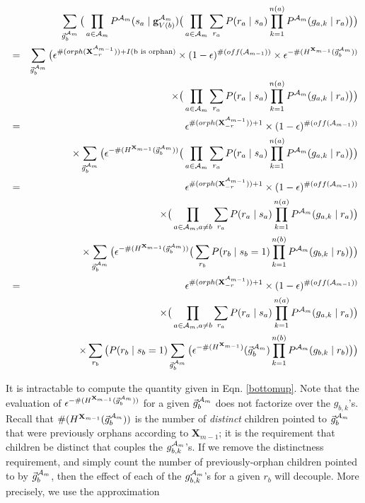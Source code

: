 \documentclass[11pt]{article}
\newcommand{\A}{{\cal A}}
\newcommand{\X}{\mathbf{X}}
\newcommand{\XrmPrev}{\X^{\A_{m-1}}_{-r}}
\newcommand{\Am}{\A_{m}}
\begin{document}
\begin{eqnarray}
& &\sum_{\vec{g}^{\Am}_{b}} \big( \prod_{a \in {\Am}} P^{\Am}(s_a \mid \mathbf{g}^{\Am}_{V({b})})  \big( \prod_{a \in {\A_{m}}} \sum_{r_a} P(r_a \mid s_a) \prod_{k=1}^{n(a)} P^{\Am}(g_{a,k} \mid r_a) \big) \big ) \\
%
&=& \sum_{\vec{g}^{\Am}_{b}} \big(\epsilon^{\#(orph(\XrmPrev)) + I(\text{b is orphan})} \times (1-\epsilon)^{\#(off(\A_{m-1}))} \times \epsilon^{- \#(H^{\X_{m-1}}(\vec{g}_b^{\Am}))}  \nonumber \\
& & \times \big( \prod_{a \in {\A_{m}}} \sum_{r_a} P(r_a \mid s_a) \prod_{k=1}^{n(a)} P^{\Am}(g_{a,k} \mid r_a) \big) \big) \\
%
&=& \epsilon^{\#(orph(\XrmPrev)) + 1} \times (1-\epsilon)^{\#(off(\A_{m-1}))} \nonumber \\
& & \times  \sum_{\vec{g}^{\Am}_{b}} \big( \epsilon^{- \#(H^{\X_{m-1}}(\vec{g}_b^{\Am}))}  \big( \prod_{a \in {\A_{m}}} \sum_{r_a} P(r_a \mid s_a) \prod_{k=1}^{n(a)} P^{\Am}(g_{a,k} \mid r_a) \big) \big) \\
%
&=& \epsilon^{\#(orph(\XrmPrev)) + 1} \times (1-\epsilon)^{\#(off(\A_{m-1}))} \nonumber \\
& &\times  \big( \prod_{a \in {\A_{m}}, a \neq b} \sum_{r_a} P(r_a \mid s_a) \prod_{k=1}^{n(a)} P^{\Am}(g_{a,k} \mid r_a) \big) \\
& & \times \sum_{\vec{g}^{\Am}_{b}} \big( \epsilon^{- \#(H^{\X_{m-1}}(\vec{g}_b^{\Am}))} \big( \sum_{r_b} P(r_b \mid s_b = 1) \prod_{k=1}^{n(b)} P^{\Am}(g_{b,k} \mid r_b) \big) \big) \nonumber \\
%
&=& \epsilon^{\#(orph(\XrmPrev)) + 1} \times (1-\epsilon)^{\#(off(\A_{m-1}))} \label{bottomup}  \\
& & \times \big( \prod_{a \in {\A_{m}}, a \neq b} \sum_{r_a} P(r_a \mid s_a) \prod_{k=1}^{n(a)} P^{\Am}(g_{a,k} \mid r_a) \big)  \\
& & \times \sum_{r_b} \big(P(r_b \mid s_b = 1) \sum_{\vec{g}^{\Am}_{b}} \big( \epsilon^{-\#(H^{\X_{m-1}})}(\vec{g}^{\Am}_b) \prod_{k=1}^{n(b)} P^{\Am}(g_{b,k} \mid r_b) \big) \big) \nonumber
\end{eqnarray} 

It is intractable to compute the quantity given in Eqn. \ref{bottomup}. Note that the evaluation of $\epsilon^{-\#(H^{\X_{m-1}}(\vec{g}^{\Am}_b))}$ for a given $\vec{g}^{\Am}_{b}$ does not factorize over the $g_{b,k}$'s. Recall that $\#(H^{\X_{m-1}}(\vec{g}^{\Am}_b))$ is the number of \emph{distinct} children pointed to $\vec{g}^{\Am}_b$ that were previously orphans according to $\X_{m-1}$; it is the requirement that children be distinct that couples the $g^{\Am}_{b,k}$'s. If we remove the distinctness requirement, and simply count the number of previously-orphan children pointed to by $\vec{g}^{\Am}_b$, then the effect of each of the $g^{\Am}_{b,k}$'s for a given $r_b$ will decouple. More precisely, we use the approximation
\end{document}

